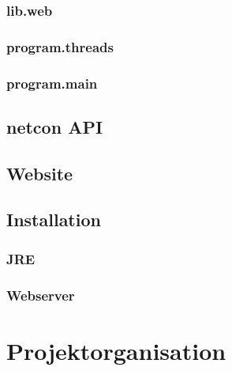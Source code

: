\documentclass[a4paper,14pt,headsepline]{scrartcl}
\begin{document}
\subsubsection*{lib.web}
\subsubsection*{program.threads}
\subsubsection*{program.main}


\newpage

\subsection{netcon API}

\newpage

\subsection{Website}

\newpage

\subsection{Installation}

\subsubsection{JRE}

\subsubsection{Webserver}

\newpage

\section{Projektorganisation}

 
\end{document}
